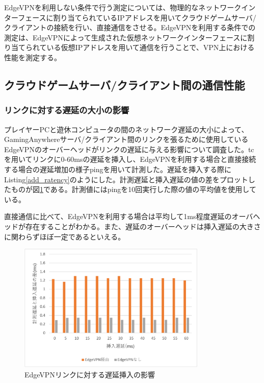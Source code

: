 EdgeVPNを利用しない条件で行う測定については、物理的なネットワークインターフェースに割り当てられているIPアドレスを用いてクラウドゲームサーバ/クライアントの接続を行い、直接通信をさせる。EdgeVPNを利用する条件での測定は、EdgeVPNによって生成された仮想ネットワークインターフェースに割り当てられている仮想IPアドレスを用いて通信を行うことで、VPN上における性能を測定する。

\subsection{クラウドゲームサーバ/クライアント間の通信性能}

\subsubsection{リンクに対する遅延の大小の影響}
プレイヤーPCと遊休コンピュータの間のネットワーク遅延の大小によって、GamingAnywhereサーバ/クライアント間のリンクを張るために使用しているEdgeVPNのオーバーヘッドがリンクの遅延に与える影響について調査した。tc\cite{iproute2}を用いてリンクに0-60msの遅延を挿入し、EdgeVPNを利用する場合と直接接続する場合の遅延増加の様子ping\cite{ping}を用いて計測した。遅延を挿入する際にListing\ref{add_ratency}のようにした。計測遅延と挿入遅延の値の差をプロットしたものが図\ref{fig:ratency}である。計測値にはpingを10回実行した際の値の平均値を使用している。

直接通信に比べて、EdgeVPNを利用する場合は平均して1ms程度遅延のオーバヘッドが存在することがわかる。また、遅延のオーバーヘッドは挿入遅延の大きさに関わらずほぼ一定であるといえる。

\begin{figure}[h!]
    \centering
    \includegraphics[width=0.8\textwidth,keepaspectratio,clip]{img/graph_ratency.pdf}
    \caption{EdgeVPNリンクに対する遅延挿入の影響}
    \label{fig:ratency}
\end{figure}

